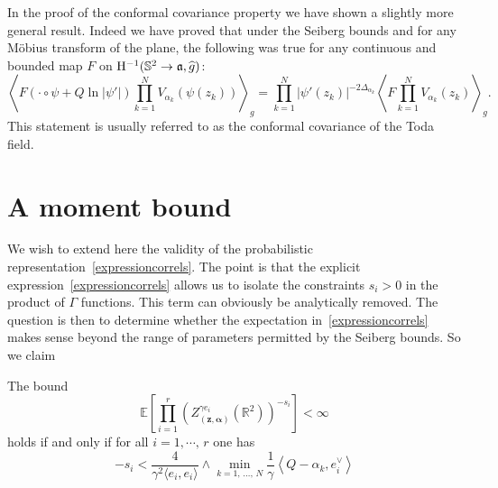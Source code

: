 \documentclass[AHL,Unicode,longabstracts,published]{cedram}
\newcommand{\frka}{\mathfrak{a}}
\newcommand{\rmH}{\mathrm{H}}
\newcommand{\R}{\mathbb{R}}
\renewcommand*\S{\mathbb{S}}
\newcommand{\E}{\mathbb{E}}
\newcommand{\ps}[1]{\langle #1 \rangle}
\newcommand{\norm}[1]{\left\lvert#1\right\rvert}
\let\oldhat\hat
\renewcommand*{\hat}[1]{\mathchoice{\widehat{#1}}{\widehat{#1}}{\oldhat{#1}}{\oldhat{#1}}}
\begin{document}
In the proof of the conformal covariance property we have shown a slightly more general result. Indeed we have proved that under the Seiberg bounds and for any M\"obius transform of the plane, the following was true for any continuous and bounded map $F$ on $\rmH^{-1}(\S^2\to\frka,\hat g)$:
\begin{equation}
\left\langle F\left(\cdot\circ\psi+Q\ln\norm{\psi'}\right)\prod_{k=1}^NV_{\alpha_k}(\psi(z_k))\right\rangle_g=\prod_{k=1}^N\left|\psi'(z_k)\right|^{-2\Delta_{\alpha_k}}\left\langle F\prod_{k=1}^NV_{\alpha_k}(z_k)\right\rangle_{g}.
\end{equation}
This statement is usually referred to as the conformal covariance of the Toda field.



\section{A moment bound}\label{section:moment}


We wish to extend here the validity of the probabilistic representation~\eqref{expressioncorrels}. The point is that the explicit expression~\eqref{expressioncorrels} allows us to isolate the constraints $s_i>0$ in the product of $\Gamma$ functions. This term can obviously be analytically removed. The question is then to determine whether the expectation in~\eqref{expressioncorrels} makes sense beyond the range of parameters permitted by the Seiberg bounds. So we claim

\begin{lemm}\label{lemmaSeibergplus}
The bound
\begin{equation}\label{expectunit}
\E \left [\prod_{i=1}^{r} \left(Z_{\left(\bm z,\bm \alpha\right)}^{\gamma e_i} \left(\R^2\right)\right)^{- s_i} \right] < \infty
\end{equation}
holds if and only if for all $i=1,\cdots,\,r$ one has
\begin{equation}\label{extSeiberg}
-s_i < \frac{4}{\gamma^2\ps{e_i,e_i}}\wedge \min_{k=1,\,\dots,\,N} \frac{1}{\gamma}\left\langle Q-\alpha_k,e_i^\vee\right\rangle
\end{equation}
\end{lemm}
\end{document}

